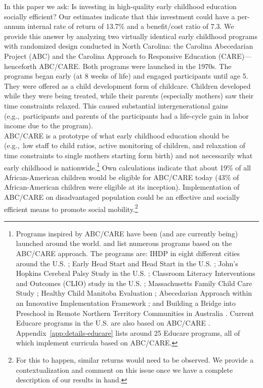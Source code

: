 \noindent In this paper we ask: Is investing in high-quality early childhood education socially efficient? Our estimates indicate that this investment could have a per-annum internal rate of return of 13.7\% and a benefit/cost ratio of 7.3. We provide this answer by analyzing two virtually identical early childhood programs with randomized design conducted in North Carolina: the Carolina Abecedarian Project (ABC) and the Carolina Approach to Responsive Education (CARE)---henceforth ABC/CARE. Both programs were launched in the 1970s. The programs began early (at 8 weeks of life) and engaged participants until age 5. They were offered as a child development form of childcare. Children developed while they were being treated, while their parents (especially mothers) saw their time constraints relaxed. This caused substantial intergenerational gains (e,g.,\ participants and parents of the participants had a life-cycle gain in labor income due to the program).\\

\noindent ABC/CARE is a prototype of what early childhood education should be (e.g.,\ low staff to child ratios, active monitoring of children, and relaxation of time constraints to single mothers starting form birth) and not necessarily what early childhood is nationwide.\footnote{Programs inspired by ABC/CARE have been (and are currently being) launched around the world. \citet{Sparling_2010_Highlights} and \citet{Ramey_Ramey_Lanzi_2014_Interventions} list numerous programs based on the ABC/CARE approach. The programs are: IHDP in eight different cities around the U.S. \citep{Spiker-etal_1997_Helping}; Early Head Start and Head Start in the U.S. \citep{Schneider_McDonald-eds_2007_Scale-Up_Vol-1}; John's Hopkins Cerebral Palsy Study in the U.S. \citep{Sparling_2010_Highlights}; Classroom Literacy Interventions and Outcomes (CLIO) study in the U.S. \citep{Sparling_2010_Highlights}; Massachusetts Family Child Care Study \citep{Collins_etal_2010_Massachusetts-Study}; Healthy Child Manitoba Evaluation \citep{Healthy_Child_Manitoba_2015_Starting-Early}; Abecedarian Approach within an Innovative Implementation Framework \citep{Jensen_Nielsen_2016_ABC-Programme-Pilot}; and Building a Bridge into Preschool in Remote Northern Territory Communities in Australia \citep{UMonash_Dataset_2015_URL}. Current Educare programs in the U.S. are also based on ABC/CARE \citep{Educare_2014_Research_Agenda,Yazejian_Bryant_2012_Educare}. Appendix~\ref{app:details-educare} lists around 25 Educare programs, all of which implement curricula based on ABC/CARE.} Own calculations indicate that about 19\% of all African-American children would be eligible for ABC/CARE today (43\% of African-American children were eligible at its inception). Implementation of ABC/CARE on disadvantaged population could be an effective and socially efficient means to promote social mobility.\footnote{For this to happen, similar returns would need to be observed. We provide a contextualization and comment on this issue once we have a complete description of our results in hand.}\\
 
